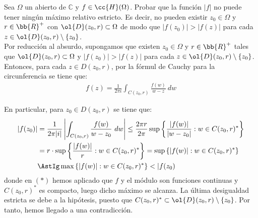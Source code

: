 \documentclass[12pt]{article}
\begin{document}
    \begin{ejercicio}[3 puntos]
        Sea $\Omega$ un abierto de $\mathbb{C}$ y $f \in \cc{H} (\Omega)$. Probar que la función $|f|$ no puede tener ningún máximo relativo estricto. Es decir, no pueden existir $z_0 \in \Omega$ y $r\in \bb{R}^+$ con $\ol{D}(z_0 , r) \subset \Omega$ de modo que $|f(z_0 )| > |f(z)|$ para cada $z \in \ol{D}(z_0 , r) \setminus \{z_0\}$.\\


        Por reducción al absurdo, supongamos que existen $z_0 \in \Omega$ y $r\in \bb{R}^+$ tales que $\ol{D}(z_0 , r) \subset \Omega$ y $|f(z_0 )| > |f(z)|$ para cada $z \in \ol{D}(z_0 , r) \setminus \{z_0\}$.\\

        Entonces, para cada $z\in D(z_0 , r)$, por la fórmul de Cauchy para la circunferencia se tiene que:
        \begin{align*}
            f(z) = \frac{1}{2\pi i} \int_{C(z_0 , r)} \frac{f(w)}{w - z}\ dw
        \end{align*}

        En particular, para $z_0\in D(z_0 , r)$ se tiene que:
        \begin{align*}
            |f(z_0)| &= \frac{1}{2\pi |i|} \left|\int_{C(z_0 , r)} \frac{f(w)}{w - z_0}\ dw\right| \leq \frac{2\pi r}{2\pi} \sup\left\{\dfrac{|f(w)|}{|w - z_0|} : w \in C(z_0 , r)^*\right\} \\
            &= r\cdot \sup\left\{\dfrac{|f(w)|}{r} : w \in C(z_0 , r)^*\right\} = \sup\left\{|f(w)| : w \in C(z_0 , r)^*\right\}
            \\ &\AstIg \max \left\{|f(w)| : w \in C(z_0 , r)^*\right\} < |f(z_0)
        \end{align*}
        donde en $(\ast)$ hemos aplicado que $f$ y el módulo son funciones continuas y $C(z_0 , r)^*$ es compacto, luego dicho máximo se alcanza. La última desigualdad estricta se debe a la hipótesis, puesto que $C(z_0 , r)^*\subset \ol{D}(z_0 , r) \setminus \{z_0\}$. Por tanto, hemos llegado a una contradicción.
    \end{ejercicio}
\end{document}
